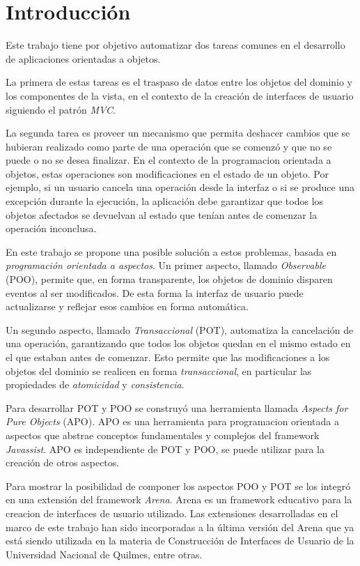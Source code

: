 \section{Introducción}

Este trabajo tiene por objetivo automatizar dos tareas comunes en el
desarrollo de aplicaciones orientadas a objetos.

La primera de estas tareas es el traspaso de datos entre los objetos del dominio
y los componentes de la vista, en el contexto de la creación de interfaces de
usuario siguiendo el patrón \emph{MVC}.
 
La segunda tarea es proveer un mecanismo que permita deshacer cambios que se
hubieran realizado como parte de una operación que se comenzó y que no se puede
o no se desea finalizar.
En el contexto de la programacion orientada a objetos, estas operaciones son
modificaciones en el estado de un objeto.
Por ejemplo, si un usuario cancela una operación desde
la interfaz o si se produce una excepción durante la ejecución, la aplicación
debe garantizar que todos los objetos afectados se devuelvan al estado que
tenían antes de comenzar la operación inconclusa.

\medskip 

En este trabajo se propone una posible solución a estos problemas, basada en
\emph{programación orientada a aspectos}.
Un primer aspecto, llamado \emph{Observable} (POO), permite que, en forma
transparente, los objetos de dominio disparen eventos al ser modificados.
De esta forma la interfaz de usuario puede actualizarse y reflejar esos
cambios en forma automática.

Un segundo aspecto, llamado \emph{Transaccional} (POT), automatiza la
cancelación de una operación, garantizando que todos los objetos quedan en el
mismo estado en el que estaban antes de comenzar. 
Esto permite que las modificaciones a los objetos del dominio se realicen
en forma \emph{transaccional}, en particular las propiedades de
\emph{atomicidad} y \emph{consistencia}.

Para desarrollar POT y POO se construyó una herramienta llamada
\emph{Aspects for Pure Objects} (APO).
APO es una herramienta para programacion orientada a aspectos que abstrae
conceptos fundamentales y complejos del framework \emph{Javassist}. 
APO es independiente de POT y POO, se puede utilizar
para la creación de otros aspectos.

Para mostrar la posibilidad de componer los aspectos POO y POT se los integró en
una extensión del framework \emph{Arena}.
Arena es un framework educativo para la creacion de interfaces de usuario
utilizado.
Las extensiones desarrolladas en el marco de este trabajo han sido incorporadas
a la última versión del Arena que ya está siendo utilizada en la materia de
Construcción de Interfaces de Usuario de la Universidad Nacional de Quilmes,
entre otras.

